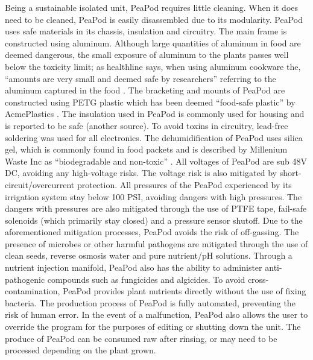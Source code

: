 \documentclass{report}
\begin{document}
Being a sustainable isolated unit, PeaPod requires little cleaning. When it does need to be cleaned, PeaPod is easily disassembled due to its modularity. 
PeaPod uses safe materials in its chassis, insulation and circuitry. 
The main frame is constructed using aluminum. Although large quantities of aluminum in food are deemed dangerous, the small exposure of aluminum to the plants passes well below the toxicity limit; as healthline says, when using aluminum cookware the, “amounts are very small and deemed safe by researchers” referring to the aluminum captured in the food %
. 
The bracketing and mounts of PeaPod are constructed using PETG plastic which has been deemed “food-safe plastic” by AcmePlastics %
. The insulation used in PeaPod is commonly used for housing and is reported to be safe (another source). 
To avoid toxins in circuitry, lead-free soldering was used for all electronics. The dehumidification of PeaPod uses silica gel, which is commonly found in food packets and is described by Millenium Waste Inc as “biodegradable and non-toxic” %
. 
All voltages of PeaPod are sub 48V DC, avoiding any high-voltage risks. The voltage risk is also mitigated by short-circuit/overcurrent protection. 
All pressures of the PeaPod experienced by its irrigation system stay below 100 PSI, avoiding dangers with high pressures. The dangers with pressures are also mitigated through the use of PTFE tape, fail-safe solenoids (which primarily stay closed) and a pressure sensor shutoff. 
Due to the aforementioned mitigation processes, PeaPod avoids the risk of off-gassing. The presence of microbes or other harmful pathogens are mitigated through the use of clean seeds, reverse osmosis water and pure nutrient/pH solutions. Through a nutrient injection manifold, PeaPod also has the ability to administer anti-pathogenic compounds such as fungicides and algicides. 
To avoid cross-contamination, PeaPod provides plant nutrients directly without the use of fixing bacteria. The production process of PeaPod is fully automated, preventing the risk of human error. 
In the event of a malfunction, PeaPod also allows the user to override the program for the purposes of editing or shutting down the unit. The produce of PeaPod can be consumed raw after rinsing, or may need to be processed depending on the plant grown. 
\end{document}
